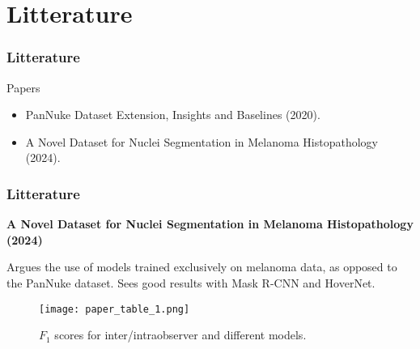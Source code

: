 \documentclass[../main.tex]{subfiles}
\begin{document}
\section{Litterature}
\begin{frame}[c]
    \frametitle{Litterature}

    \begin{block}{Papers}
        \begin{itemize}
            \item PanNuke Dataset Extension, Insights and Baselines (2020).
            \item A Novel Dataset for Nuclei Segmentation in Melanoma Histopathology (2024).
        \end{itemize}
    \end{block}
\end{frame}

\begin{frame}[t]
    \frametitle{Litterature}
    \textbf{A Novel Dataset for Nuclei Segmentation in Melanoma Histopathology (2024)}

    \vspace{20pt}
    Argues the use of models trained exclusively on melanoma data, as opposed to the PanNuke dataset. Sees good results with Mask R-CNN and HoverNet.

    \begin{figure}[h]
        \centering
        \texttt{[image: paper\_table\_1.png]}
        \caption{$F_1$ scores for inter/intraobserver and different models.}
    \end{figure}
\end{frame}
\end{document}
